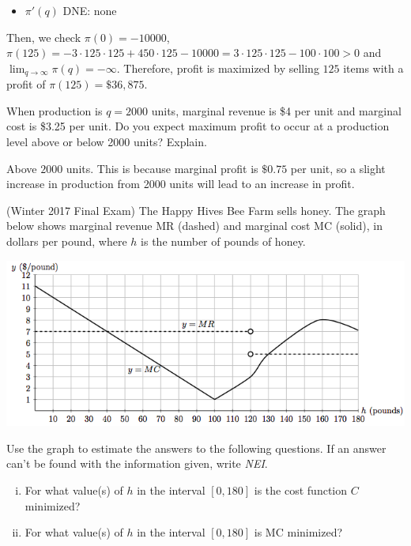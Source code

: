 \documentclass[11pt]{exam}
\begin{document}
\begin{questions}
\begin{solution}
\begin{itemize}
      \item \(\pi'(q)\) DNE: none
      \end{itemize}
      Then, we check \(\pi(0) = -10000\), \(\pi(125) = -3 \cdot 125
      \cdot 125 + 450 \cdot 125 -10000 = 3 \cdot 125 \cdot 125 - 100
      \cdot 100 > 0\) and \(\lim_{q\to\infty}
      \pi(q) = -\infty\). Therefore, profit is maximized by selling
      \(125\) items with a profit of \(\pi(125)= \$36,875\).
    \end{solution}
    \vspace{0.7in}
  \question When production is \(q=2000\) units, marginal revenue is
    \$4 per unit and marginal cost is \$3.25 per unit.  Do you expect
    maximum profit to occur at a production level above or below 2000 units? Explain.
    \begin{solution}
      Above \(2000\) units. This is because marginal profit is
      \(\$0.75\) per unit, so a slight increase in production from
      2000 units will
      lead to an increase in profit.
    \end{solution}
    \pagebreak
    \ifprintanswers 
    
    \else
    
    \fi
    \pagebreak
  \question (Winter 2017 Final Exam) %
    The Happy Hives Bee Farm sells honey. The graph below shows marginal revenue
MR (dashed) and marginal cost MC (solid), in dollars per pound, where $h$ is the number of
pounds of honey.
\begin{center}
  \includegraphics[scale=0.5]{bees}
\end{center}
Use the graph to estimate the answers to the following questions. If an answer can't be found with the information given, write \emph{NEI}.
	\begin{enumerate}[(i)]
		\item For what value(s) of $h$ in the interval $[0, 180]$ is the cost function $C$ minimized?
		\item For what value(s) of $h$ in the interval $[0, 180]$ is MC minimized?

\end{enumerate}
\end{questions}
\end{document}
